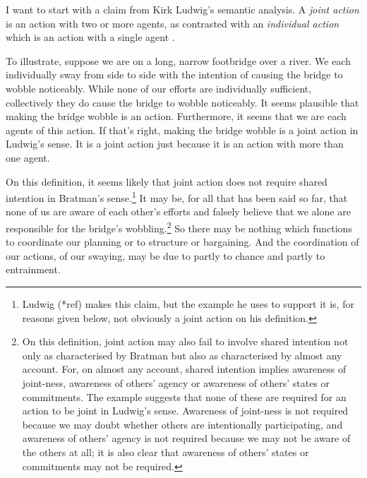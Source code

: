 \documentclass[12pt,a4paper]{extarticle}
\begin{document}
I want to start with a claim from Kirk Ludwig's semantic analysis.  
A \emph{joint action} is an action with two or more agents, as contrasted with an \emph{individual action} which is an action with a single agent \citep[p.\ 366]{ludwig_collective_2007}.

To illustrate, suppose we are on a long, narrow footbridge over a river.
We each individually sway from side to side with the intention of causing the bridge to wobble noticeably.
While none of our efforts are individually sufficient, collectively they do cause the bridge to wobble noticeably.
It seems plausible that making the bridge wobble is an action.
Furthermore, it seems that we are each agents of this action.
If that's right, making the bridge wobble is a joint action in Ludwig's sense.
It is a joint action just because it is an action with more than one agent.

On this definition, it seems likely that joint action does not require shared intention in Bratman's sense.\footnote{
Ludwig (*ref) makes this claim, but the example he uses to support it is, for reasons given below, not obviously a joint action on his definition.
}
It may be, for all that has been said so far, that none of us are aware of each other's efforts and falsely believe that we alone are responsible for the bridge's wobbling.\footnote{
On this definition, joint action may also fail to involve shared intention not only as characterised by Bratman but also as characterised by almost any account.
For, on almost any account, shared intention implies awareness of joint-ness, awareness of others' agency or awareness of others' states or commitments.
The example suggests that none of these are required for an action to be joint in Ludwig's sense.
Awareness of joint-ness is not required because we may doubt whether others are intentionally participating, and awareness of others' agency is not required because we may not be aware of the others at all; it is also clear that awareness of others' states or commitments may not be required.
}
So there may be nothing which functions to coordinate our planning or to structure or bargaining.
And the coordination of our actions, of our swaying, may be due to partly to chance and partly to entrainment.
\end{document}
